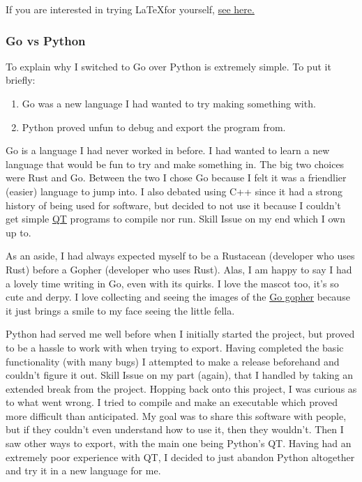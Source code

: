 If you are interested in trying \LaTeX for yourself,
\href{https://www.latex-project.org/get/}{see here.}

\subsubsection{Go vs Python}

To explain why I switched to Go over Python is extremely simple.
To put it briefly:
\begin{enumerate}
	\item Go was a new language I had wanted to try making something with.
	\item Python proved unfun to debug and export the program from.
\end{enumerate}

Go is a language I had never worked in before. I had wanted to
learn a new language that would be fun to try and make something
in. The big two choices were Rust and Go. Between the two I chose Go because
I felt it was a friendlier (easier) language to jump into. I also
debated using C++ since it had a strong history of being used for
software, but decided to not use it because I couldn't
get simple \href{https://www.qt.io/product/framework}{QT}
programs to compile nor run. Skill Issue on my end which I own up to.

As an aside, I had always expected myself to be a Rustacean
(developer who uses Rust) before a
Gopher (developer who uses Rust). Alas, I am happy to say I had a
lovely time writing in Go,
even with its quirks. I love the mascot too, it's so cute and derpy.
I love collecting and seeing the images of the
\href{https://go.dev/blog/gopher}{Go gopher}
because it just brings a smile to my face seeing the little fella.

Python had served me well before when I initially started the
project, but proved to be a hassle to work with when trying to
export. Having completed the basic functionality (with many bugs) I
attempted to make a release beforehand and couldn't figure it out.
Skill Issue on my part (again), that I handled by taking an extended break
from the project.
Hopping back onto this project, I was curious as to what went
wrong. I tried to compile and make an executable which proved more
difficult than anticipated. My goal was to share this software with
people, but if they couldn't even understand how to use it, then
they wouldn't. Then I saw other ways to export, with the main one
being Python's QT.
Having had an extremely poor experience with QT, I decided to just
abandon Python altogether and try it in a new language for me.

